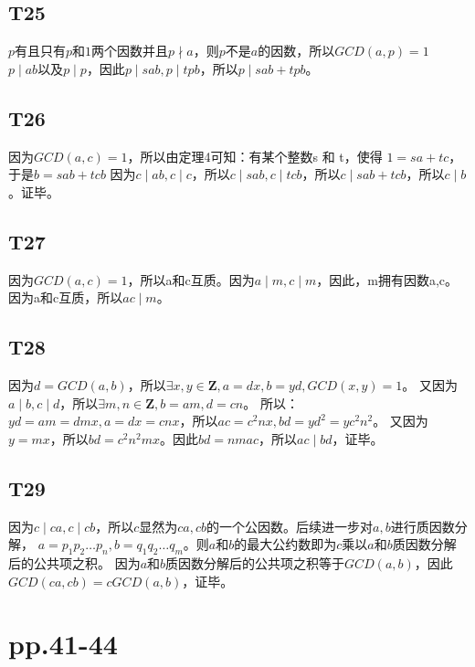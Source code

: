 \documentclass{article}
\begin{document}
\subsection{T25}
$p$有且只有$p$和$1$两个因数并且$p \nmid a$，则$p$不是$a$的因数，所以$GCD(a, p) = 1$\\
$p \mid ab$以及$p \mid p$，因此$p \mid sab, p \mid tpb$，所以$p \mid sab + tpb$。

\subsection{T26}
因为$GCD(a, c) = 1$，所以由定理4可知：有某个整数s 和 t，使得 $1 = sa + tc$，于是$b = sab + tcb$
因为$c \mid ab, c \mid c$，所以$c \mid sab, c \mid tcb$，所以$c \mid sab + tcb$，所以$c \mid b$。证毕。

\subsection{T27}
因为$GCD(a,c) = 1$，所以a和c互质。因为$a \mid m, c \mid m$，因此，m拥有因数a,c。因为a和c互质，所以$ac \mid m$。

\subsection{T28}
因为$d = GCD(a,b)$，所以$\exists x,y \in \mathbf{Z}, a = dx, b = yd, GCD(x,y) = 1$。
又因为$a \mid b, c\mid d$，所以$\exists m,n \in \mathbf{Z}, b = am, d = cn$。
所以：$yd = am = dmx, a = dx = cnx$，所以$ac = c^2nx, bd = yd^2 = yc^2n^2$。
又因为$y = mx$，所以$bd = c^2n^2mx$。因此$bd = nmac$，所以$ac \mid bd$，证毕。

\subsection{T29}
因为$c \mid ca,c \mid cb$，所以$c$显然为$ca,cb$的一个公因数。后续进一步对$a,b$进行质因数分解，
$a = p_1p_2 \dots p_n, b = q_1q_2 \dots q_m$。则$a$和$b$的最大公约数即为$c$乘以$a$和$b$质因数分解后的公共项之积。
因为$a$和$b$质因数分解后的公共项之积等于$GCD(a,b)$，因此$GCD(ca,cb) = cGCD(a,b)$，证毕。

\section{pp.41-44}
\end{document}
